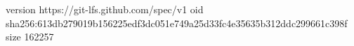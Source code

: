 version https://git-lfs.github.com/spec/v1
oid sha256:613db279019b156225edf3dc051e749a25d33fc4e35635b312ddc299661c398f
size 162257
